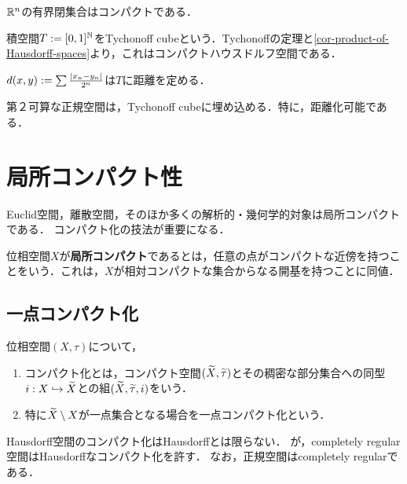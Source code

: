 \documentclass[uplatex,dvipdfmx]{jsreport}
\begin{document}
\begin{theorem}
    $\mathbb{R}^n$の有界閉集合はコンパクトである．
\end{theorem}

\begin{definition}
    積空間$T:=[0,1]^{\mathbb{N}}$をTychonoff cubeという．Tychonoffの定理と\ref{cor-product-of-Hausdorff-spaces}より，これはコンパクトハウスドルフ空間である．
\end{definition}

\begin{lemma}
    $d(x,y):=\sum\frac{\lvert x_n-y_n\rvert}{2^n}$は$T$に距離を定める．
\end{lemma}

\begin{theorem}[Urysohnの距離付け定理]\label{thm-Urysohn-metrization}
    第２可算な正規空間は，Tychonoff cubeに埋め込める．特に，距離化可能である．
\end{theorem}

\section{局所コンパクト性}

\begin{tcolorbox}[colframe=ForestGreen, colback=ForestGreen!10!white,breakable,colbacktitle=ForestGreen!40!white,coltitle=black,fonttitle=\bfseries\sffamily,
title=]
    Euclid空間，離散空間，そのほか多くの解析的・幾何学的対象は局所コンパクトである．
    コンパクト化の技法が重要になる．
\end{tcolorbox}

\begin{definition}
    位相空間$X$が\textbf{局所コンパクト}であるとは，任意の点がコンパクトな近傍を持つことをいう．これは，$X$が相対コンパクトな集合からなる開基を持つことに同値．
\end{definition}

\subsection{一点コンパクト化}

\begin{definition}[compactification]
    位相空間$(X,\tau)$について，
    \begin{enumerate}
        \item コンパクト化とは，コンパクト空間$(\widetilde{X},\widetilde{\tau})$とその稠密な部分集合への同型$i:X\hookrightarrow\widetilde{X}$との組$(\widetilde{X},\widetilde{\tau},i)$をいう．
        \item 特に$\widetilde{X}\setminus X$が一点集合となる場合を一点コンパクト化という．
    \end{enumerate}
\end{definition}
\begin{remarks}
    Hausdorff空間のコンパクト化はHausdorffとは限らない．
    が，completely regular空間はHausdorffなコンパクト化を許す．
    なお，正規空間はcompletely regularである．
\end{remarks}
\end{document}
